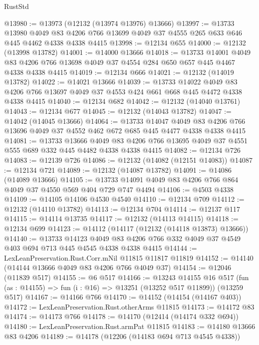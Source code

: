 \begin{lexlean}{RustStd}
\begin{coremodule}
@13980 := @13973 (@12132 (@13974 @13976) @13666)
@13997 := @13733
    @13980
    @4049
    @83
    @4206
    @766
    @13699
    @4049
    @37
    @4555
    @265
    @633
    @646
    @445
    @4462
    @4338
    @4338
    @4415
@13998 := @12134 @655
@14000 := @12132 (@13998 @13782)
@14001 := @14000 @13666
@14018 := @13733
    @14001
    @4049
    @83
    @4206
    @766
    @13698
    @4049
    @37
    @4554
    @284
    @650
    @657
    @445
    @4467
    @4338
    @4338
    @4415
@14019 := @12134 @666
@14021 := @12132 (@14019 @13782)
@14022 := @14021 @13666
@14039 := @13733
    @14022
    @4049
    @83
    @4206
    @766
    @13697
    @4049
    @37
    @4553
    @424
    @661
    @668
    @445
    @4472
    @4338
    @4338
    @4415
@14040 := @12134 @682
@14042 := @12132 (@14040 @13761)
@14043 := @12134 @677
@14045 := @12132 (@14043 @13782)
@14047 := @14042 (@14045 @13666)
@14064 := @13733
    @14047
    @4049
    @83
    @4206
    @766
    @13696
    @4049
    @37
    @4552
    @462
    @672
    @685
    @445
    @4477
    @4338
    @4338
    @4415
@14081 := @13733
    @13666
    @4049
    @83
    @4206
    @766
    @13695
    @4049
    @37
    @4551
    @555
    @689
    @332
    @445
    @4482
    @4338
    @4338
    @4415
@14082 := @12134 @726
@14083 := @12139 @726
@14086 := @12132 (@14082 (@12151 @14083))
@14087 := @12134 @721
@14089 := @12132 (@14087 @13782)
@14091 := @14086 (@14089 @13666)
@14105 := @13733 @14091 @4049 @83 @4206 @766 @864 @4049 @37 @4550 @569 @404 @729 @747 @4494
@14106 := @4503 @4338
@14109 := @14105 @14106 @4530 @4540
@14110 := @12134 @709
@14112 := @12132 (@14110 @13782)
@14113 := @12134 @704
@14114 := @12137 @117
@14115 := @14114 @13735
@14117 := @12132 (@14113 @14115)
@14118 := @12134 @699
@14123 := @14112 (@14117 (@12132 (@14118 @13873) @13666))
@14140 := @13733
    @14123
    @4049
    @83
    @4206
    @766
    @332
    @4049
    @37
    @4549
    @403
    @694
    @713
    @445
    @4545
    @4338
    @4338
    @4415
@14144 := LexLeanPreservation.Rust.Corr.mNil @11815 @11817 @11819
@14152 := @14140 (@14144 @13666 @4049 @83 @4206 @766 @4049 @37)
@14154 := @12046 (@11839 @517)
@14155 := @6 @517
@14166 := @13243
    @14155
    @16
    @517
    (fun (as : @14155) => fun (i : @16) => @13251 (@13252 @517 @11899))
    (@13259 @517)
@14167 := @14166 @766
@14170 := @14152 (@14154 (@14167 @403))
@14172 := LexLeanPreservation.Rust.otherArms @11815
@14173 := @14172 @83
@14174 := @14173 @766
@14178 := @14170 (@12414 (@14174 @332 @694))
@14180 := LexLeanPreservation.Rust.armPat @11815
@14183 := @14180 @13666 @83 @4206
@14189 := @14178 (@12206 (@14183 @694 @713 @4545 @4338))

\end{coremodule}
\end{lexlean}
